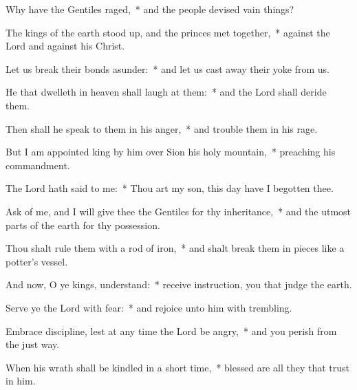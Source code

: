 \begin{enpars}
\item Why have the Gentiles raged,~* and the people devised vain things?
\item The kings of the earth stood up, and the princes met together,~* against the Lord and against his Christ.
\item Let us break their bonds asunder:~* and let us cast away their yoke from us.
\item He that dwelleth in heaven shall laugh at them:~* and the Lord shall deride them.
\item Then shall he speak to them in his anger,~* and trouble them in his rage.
\item But I am appointed king by him over Sion his holy mountain,~* preaching his commandment.
\item The Lord hath said to me:~* Thou art my son, this day have I begotten thee.
\item Ask of me, and I will give thee the Gentiles for thy inheritance,~* and the utmost parts of the earth for thy possession.
\item Thou shalt rule them with a rod of iron,~* and shalt break them in pieces like a potter’s vessel.
\item And now, O ye kings, understand:~* receive instruction, you that judge the earth.
\item Serve ye the Lord with fear:~* and rejoice unto him with trembling.
\item Embrace discipline, lest at any time the Lord be angry,~* and you perish from the just way.
\item When his wrath shall be kindled in a short time,~* blessed are all they that trust in him.
\end{enpars}